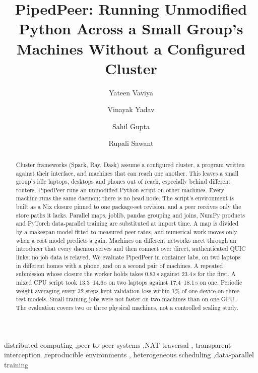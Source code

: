 \documentclass[5p,times,twocolumn]{elsarticle}
\begin{document}
\begin{frontmatter}

\title{PipedPeer: Running Unmodified Python Across a Small Group's Machines
Without a Configured Cluster}

\author[spit]{Yateen Vaviya}
\author[spit]{Vinayak Yadav}
\author[spit]{Sahil Gupta}
\author[spit]{Rupali Sawant}


\begin{abstract}
Cluster frameworks (Spark, Ray, Dask) assume a configured cluster, a
program written against their interface, and machines that can reach one
another. This leaves a small group's idle laptops, desktops and phones out of reach,
especially behind different routers. PipedPeer runs an unmodified Python script on other machines.
Every machine runs the same daemon; there is no head node. The script's
environment is built as a Nix closure pinned to one package-set revision, and a
peer receives only the store paths it lacks. Parallel maps, joblib, pandas
grouping and joins, NumPy products and PyTorch data-parallel training are
substituted at import time. A map is divided by a makespan model fitted to
measured peer rates, and numerical work moves only when a cost model predicts a
gain. Machines on different networks meet through an introducer that every
daemon serves and then connect over direct, authenticated QUIC links; no job
data is relayed. We evaluate PipedPeer in container labs, on two laptops in
different homes with a phone, and on a second pair of machines. A repeated
submission whose closure the worker holds takes 0.83\,s against 23.4\,s for the first. A
mixed CPU script took 13.3--14.6\,s on two laptops against 17.4--18.1\,s on
one. Periodic weight averaging every 32 steps kept validation loss within 1\%
of one device on three test models. Small training jobs were not faster on
two machines than on one GPU. The evaluation covers two or three physical
machines, not a controlled scaling study.
\end{abstract}

\begin{keyword}
distributed computing \sep peer-to-peer systems \sep NAT traversal \sep
transparent interception \sep reproducible environments \sep
heterogeneous scheduling \sep data-parallel training
\end{keyword}

\end{frontmatter}
\end{document}
